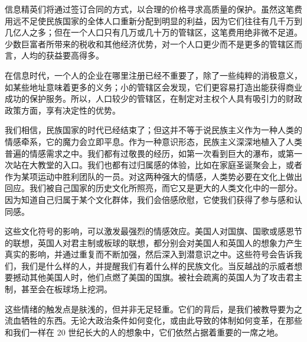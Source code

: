 信息精英们将通过签订合同的方式，以合理的价格寻求高质量的保护。虽然这笔费用远不足使民族国家的全体人口重新分配到明显的利益，因为它们往往有几千万到几亿人之多；但在一个人口只有几万或几十万的管辖区，这笔费用绝非微不足道。少数巨富者所带来的税收和其他经济优势，对一个人口更少而不是更多的管辖区而言，人均的获益要高得多。

在信息时代，一个人的企业在哪里注册已经不重要了，除了一些纯粹的消极意义，如某些地址意味着更多的义务；小的管辖区会发现，它们更容易打造出能获得商业成功的保护服务。所以，人口较少的管辖区，在制定对主权个人具有吸引力的财政政策方面，享有决定性的优势。

我们相信，民族国家的时代已经结束了；但这并不等于说民族主义作为一种人类的情感牵系，它的魔力会立即平息。作为一种意识形态，民族主义深深地植入了人类普遍的情感需求之中。我们都有过敬畏的经历，如第一次看到巨大的瀑布，或第一次站在大教堂的入口。我们也都有过归属感的体验，比如在家庭圣诞聚会上，或者作为某项运动中胜利团队的一员。对这两种强大的情感，人类势必要在文化上做出回应。我们被自己国家的历史文化所照亮，而它又是更大的人类文化中的一部分。因为知道自己归属于某个文化群体，我们会倍感欣慰，它使我们获得了参与感和认同感。

这些文化符号的影响，可以激发最强烈的情感效应。美国人对国旗、国歌或感恩节的联想，英国人对君主制或板球的联想，都分别会对美国人和英国人的想象力产生真实的影响，并通过重复而不断加强，然后深入到潜意识之中。这些符号会告诉我们，我们是什么样的人，并提醒我们有着什么样的民族文化。当反越战的示威者想要撼动其他美国人时，他们点燃了美国的国旗。被社会疏离的英国人为了攻击君主制，甚至会在板球场上挖洞。

这些情绪的触发点是肤浅的，但并非无足轻重。它们的背后，是我们被教导要为之流血牺牲的东西。无论大政治条件如何变化，或由此导致的体制如何变革，在那些和我们一样在 20 世纪长大的人的想象中，它们依然占据着重要的一席之地。